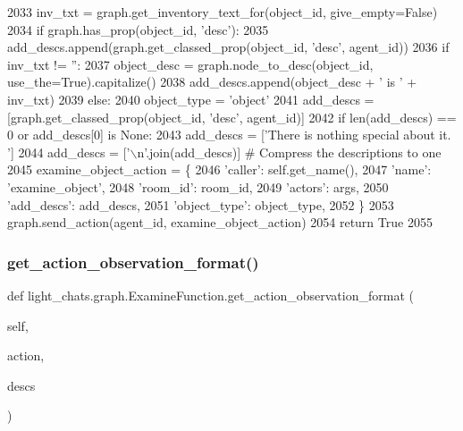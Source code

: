 \begin{DoxyCode}
2033             inv\_txt = graph.get\_inventory\_text\_for(object\_id, give\_empty=\textcolor{keyword}{False})
2034             \textcolor{keywordflow}{if} graph.has\_prop(object\_id, \textcolor{stringliteral}{'desc'}):
2035                 add\_descs.append(graph.get\_classed\_prop(object\_id, \textcolor{stringliteral}{'desc'}, agent\_id))
2036             \textcolor{keywordflow}{if} inv\_txt != \textcolor{stringliteral}{''}:
2037                 object\_desc = graph.node\_to\_desc(object\_id, use\_the=\textcolor{keyword}{True}).capitalize()
2038                 add\_descs.append(object\_desc + \textcolor{stringliteral}{' is '} + inv\_txt)
2039         \textcolor{keywordflow}{else}:
2040             object\_type = \textcolor{stringliteral}{'object'}
2041             add\_descs = [graph.get\_classed\_prop(object\_id, \textcolor{stringliteral}{'desc'}, agent\_id)]
2042         \textcolor{keywordflow}{if} len(add\_descs) == 0 \textcolor{keywordflow}{or} add\_descs[0] \textcolor{keywordflow}{is} \textcolor{keywordtype}{None}:
2043             add\_descs = [\textcolor{stringliteral}{'There is nothing special about it. '}]
2044         add\_descs = [\textcolor{stringliteral}{'\(\backslash\)n'}.join(add\_descs)]  \textcolor{comment}{# Compress the descriptions to one}
2045         examine\_object\_action = \{
2046             \textcolor{stringliteral}{'caller'}: self.get\_name(),
2047             \textcolor{stringliteral}{'name'}: \textcolor{stringliteral}{'examine\_object'},
2048             \textcolor{stringliteral}{'room\_id'}: room\_id,
2049             \textcolor{stringliteral}{'actors'}: args,
2050             \textcolor{stringliteral}{'add\_descs'}: add\_descs,
2051             \textcolor{stringliteral}{'object\_type'}: object\_type,
2052         \}
2053         graph.send\_action(agent\_id, examine\_object\_action)
2054         \textcolor{keywordflow}{return} \textcolor{keyword}{True}
2055 
\end{DoxyCode}
\mbox{\label{classlight__chats_1_1graph_1_1ExamineFunction_ae3397289f3f0751980ba2a2165af82dc}} 
\subsubsection{\texorpdfstring{get\+\_\+action\+\_\+observation\+\_\+format()}{get\_action\_observation\_format()}}
{\footnotesize\ttfamily def light\+\_\+chats.\+graph.\+Examine\+Function.\+get\+\_\+action\+\_\+observation\+\_\+format (\begin{DoxyParamCaption}\item[{}]{self,  }\item[{}]{action,  }\item[{}]{descs }\end{DoxyParamCaption})}



